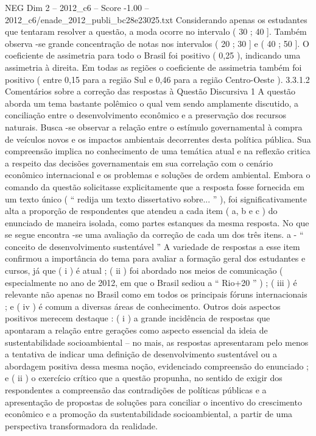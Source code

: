 \begin{textsample}{NEG Dim 2 – 2012\_c6 – Score -1.00 – 2012\_c6/enade\_2012\_publi\_bc28e23025.txt}
Considerando apenas os estudantes que tentaram resolver a questão, a moda ocorre no intervalo ( 30 ; 40 ].
Também observa -se grande concentração de notas nos intervalos ( 20 ; 30 ] e ( 40 ; 50 ].
O coeficiente de assimetria para todo o Brasil foi positivo ( 0,25 ), indicando uma assimetria à direita.
Em todas as regiões o coeficiente de assimetria também foi positivo ( entre 0,15 para a região Sul e 0,46 para a região Centro-Oeste ). 3.3.1.2 Comentários sobre a correção das respostas à Questão Discursiva 1 A questão aborda um tema bastante polêmico o qual vem sendo amplamente discutido, a conciliação entre o desenvolvimento econômico e a preservação dos recursos naturais.
Busca -se observar a relação entre o estímulo governamental à compra de veículos novos e os impactos ambientais decorrentes desta política pública.
Sua compreensão implica no conhecimento de uma temática atual e na reflexão critica a respeito das decisões governamentais em sua correlação com o cenário econômico internacional e os problemas e soluções de ordem ambiental.
Embora o comando da questão solicitasse explicitamente que a resposta fosse fornecida em um texto único ( “ redija um texto dissertativo sobre... ” ), foi significativamente alta a proporção de respondentes que atendeu a cada item ( a, b e c ) do enunciado de maneira isolada, como partes estanques da mesma resposta.
No que se segue encontra -se uma avaliação da correção de cada um dos três itens. a - “ conceito de desenvolvimento sustentável ” A variedade de respostas a esse item confirmou a importância do tema para avaliar a formação geral dos estudantes e cursos, já que ( i ) é atual ; ( ii ) foi abordado nos meios de comunicação ( especialmente no ano de 2012, em que o Brasil sediou a “ Rio+20 ” ) ; ( iii ) é relevante não apenas no Brasil como em todos os principais fóruns internacionais ; e ( iv ) é comum a diversas áreas de conhecimento.
Outros dois aspectos positivos merecem destaque : ( i ) a grande incidência de respostas que apontaram a relação entre gerações como aspecto essencial da ideia de sustentabilidade socioambiental – no mais, as respostas apresentaram pelo menos a tentativa de indicar uma definição de desenvolvimento sustentável ou a abordagem positiva dessa mesma noção, evidenciado compreensão do enunciado ; e ( ii ) o exercício crítico que a questão propunha, no sentido de exigir dos respondentes a compreensão das contradições de políticas públicas e a apresentação de propostas de soluções para conciliar o incentivo do crescimento econômico e a promoção da sustentabilidade socioambiental, a partir de uma perspectiva transformadora da realidade.

\end{textsample}
